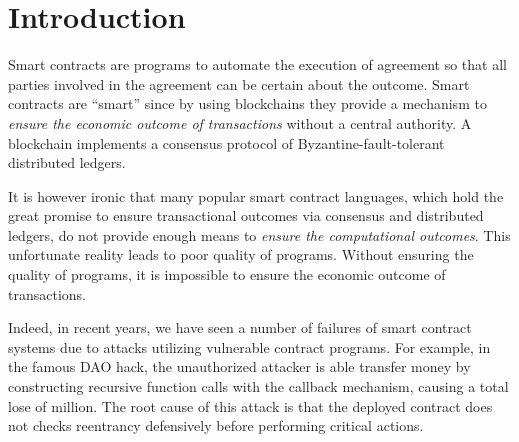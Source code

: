 \section{Introduction} \label{sec:intro}






Smart contracts are programs to automate the execution of agreement so that all
parties involved in the agreement can be certain about the outcome.
Smart contracts are ``smart'' since by using blockchains they provide a
mechanism to \emph{ensure the economic outcome of transactions} without a
central authority.
A blockchain implements a consensus protocol of Byzantine-fault-tolerant
distributed ledgers.

It is however ironic that many popular smart contract languages, which hold the
great promise to ensure transactional outcomes via consensus and distributed
ledgers, do not provide enough means to \emph{ensure the computational outcomes}.
This unfortunate reality leads to poor quality of programs.
Without ensuring the quality of programs, it is impossible to ensure the
economic outcome of transactions.

Indeed, in recent years, we have seen a number of failures of smart contract
systems due to attacks utilizing vulnerable contract programs.
For example, in the famous DAO hack, the unauthorized attacker is
able transfer money by constructing recursive function calls with
the callback mechanism, causing a total lose of  million.
The root cause of this attack is that the deployed contract does not
checks reentrancy defensively before performing critical actions.

